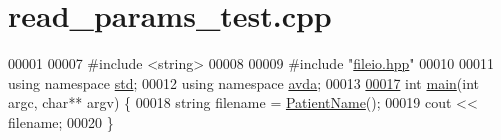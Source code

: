 \hypertarget{read__params__test_8cpp_source}{\section{read\+\_\+params\+\_\+test.\+cpp}
\label{read__params__test_8cpp_source}
}

\begin{DoxyCode}
00001 
00007 \textcolor{preprocessor}{#include <string>}
00008 
00009 \textcolor{preprocessor}{#include "\hyperlink{fileio_8hpp}{fileio.hpp}"}
00010 
00011 \textcolor{keyword}{using namespace }\hyperlink{namespacestd}{std};
00012 \textcolor{keyword}{using namespace }\hyperlink{namespaceavda}{avda};
00013 
\hypertarget{read__params__test_8cpp_source_l00017}{}\hyperlink{read__params__test_8cpp_a3c04138a5bfe5d72780bb7e82a18e627}{00017} \textcolor{keywordtype}{int} \hyperlink{read__params__test_8cpp_a3c04138a5bfe5d72780bb7e82a18e627}{main}(\textcolor{keywordtype}{int} argc, \textcolor{keywordtype}{char}** argv) \{
00018     \textcolor{keywordtype}{string} filename = \hyperlink{namespaceavda_ae20728e7e8ae50bf2f74849e538841ea}{PatientName}();
00019     cout << filename;
00020 \}
\end{DoxyCode}
